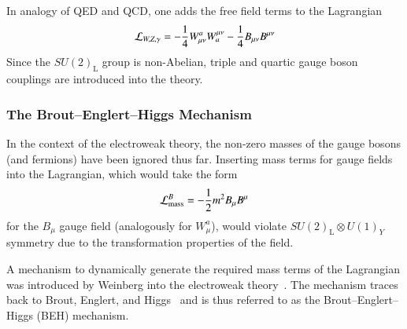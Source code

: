 In analogy of QED and QCD, one adds the free field terms to the Lagrangian
\begin{align*}
  \mathcal{L}_{W, Z, \gamma} =
  - \frac{1}{4} W_{\mu\nu}^a W^{\mu\nu}_a
  - \frac{1}{4} B_{\mu\nu} B^{\mu\nu}
\end{align*}
Since the $SU(2)_{\text{L}}$ group is non-Abelian, triple and quartic gauge
boson couplings are introduced into the theory.


\subsubsection{The Brout--Englert--Higgs Mechanism}

In the context of the electroweak theory, the non-zero masses of the gauge
bosons (and fermions) have been ignored thus far. Inserting mass terms for gauge
fields into the Lagrangian, which would take the form
\begin{align*}
  \mathcal{L}_{\text{mass}}^{B} = -\frac{1}{2} m^2 B_\mu B^\mu
\end{align*}
for the $B_\mu$ gauge field (analogously for $W_\mu^a$), would violate
$SU(2)_{\text{L}} \otimes U(1)_Y$ symmetry due to the transformation properties
of the field.

A mechanism to dynamically generate the required mass terms of the Lagrangian
was introduced by Weinberg into the electroweak
theory~\cite{Weinberg:1967tq}. The mechanism traces back to Brout, Englert, and
Higgs~\cite{Englert:1964et,Higgs:1964pj} and is thus referred to as the
Brout--Englert--Higgs (BEH) mechanism.

